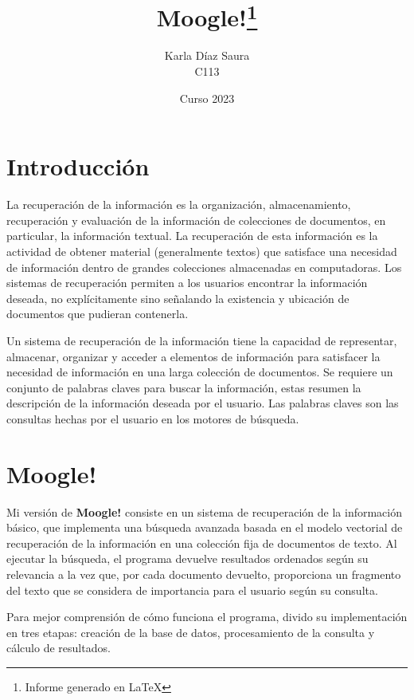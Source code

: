 \documentclass[12pt, letterpaper]{article}
\title{\huge\textbf{Moogle!}\thanks{\small Informe generado en \LaTeX}}
\author{\large Karla Díaz Saura\\ \small C113}
\date{\small Curso 2023}
\begin{document}
\maketitle

\newpage
\tableofcontents

\newpage
\section{Introducción}
La recuperación de la información es la organización, almacenamiento, recuperación y evaluación de la información de colecciones de documentos, en particular, la información textual. La recuperación de esta información es la actividad de obtener material (generalmente textos) que satisface una necesidad de información dentro de grandes colecciones almacenadas en computadoras. Los sistemas de recuperación permiten a los usuarios encontrar la información deseada, no explícitamente sino señalando la existencia y ubicación de documentos que pudieran contenerla.

Un sistema de recuperación de la información tiene la capacidad de representar, almacenar, organizar y acceder a elementos de información para satisfacer la necesidad de información en una larga colección de documentos. Se requiere un conjunto de palabras claves para buscar la información, estas resumen la descripción de la información deseada por el usuario. Las palabras claves son las consultas hechas por el usuario en los motores de búsqueda. 

\section{Moogle!}
    Mi versión de \textbf{Moogle!} consiste en un sistema de recuperación de la información básico, que implementa una búsqueda avanzada basada en el modelo vectorial de recuperación de la información en una colección fija de documentos de texto. Al ejecutar la búsqueda, el programa devuelve resultados ordenados según su relevancia a la vez que, por cada documento devuelto, proporciona un fragmento del texto que se considera de importancia para el usuario según su consulta.
    
    Para mejor comprensión de cómo funciona el programa, divido su implementación en tres etapas: creación de la base de datos, procesamiento de la consulta y cálculo de resultados.
\end{document}
